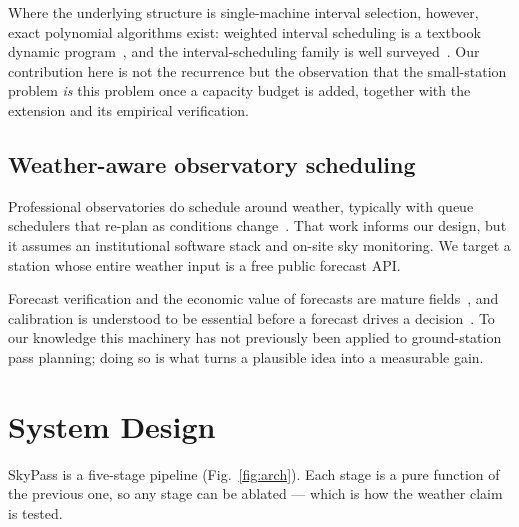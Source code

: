 \documentclass[conference]{IEEEtran}
\begin{document}
Where the underlying structure is single-machine interval selection, however,
exact polynomial algorithms exist: weighted interval scheduling is a textbook
dynamic program~\cite{kleinberg2006algorithm, cormen2009introduction}, and the
interval-scheduling family is well surveyed~\cite{kolen2007interval,
bar2001unified}. Our contribution here is not the recurrence but the observation
that the small-station problem \emph{is} this problem once a capacity budget is
added, together with the extension and its empirical verification.

\subsection{Weather-aware observatory scheduling}
Professional observatories do schedule around weather, typically with
queue schedulers that re-plan as conditions
change~\cite{denny2004automatic, colome2012research, lampoudi2015scheduling,
solar2016autonomous}. That work informs our design, but it assumes an
institutional software stack and on-site sky monitoring. We target a station
whose entire weather input is a free public forecast API.

Forecast verification and the economic value of forecasts are mature
fields~\cite{wilks2011statistical, richardson2000skill, zhu2002economic}, and
calibration is understood to be essential before a forecast drives a
decision~\cite{gneiting2007probabilistic}. To our knowledge this machinery has
not previously been applied to ground-station pass planning; doing so is what
turns a plausible idea into a measurable gain.

\section{System Design}
\label{sec:design}

SkyPass is a five-stage pipeline (Fig.~\ref{fig:arch}). Each stage is a pure
function of the previous one, so any stage can be ablated --- which is how the
weather claim is tested.
\end{document}
